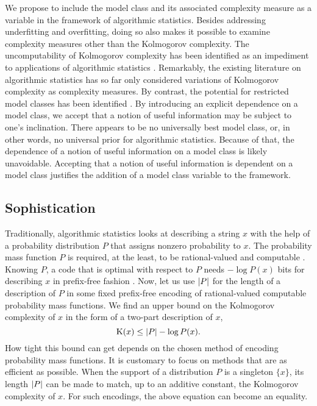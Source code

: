 We propose to include the model class and its associated complexity measure as a variable in the framework of algorithmic statistics.
Besides addressing underfitting and overfitting, doing so also makes it possible to examine complexity measures other than the Kolmogorov complexity.
The uncomputability of Kolmogorov complexity has been identified as an impediment to applications of algorithmic statistics \parencite{rissanen1983universal,vereshchagin2017algorithmic}.
Remarkably, the existing literature on algorithmic statistics has so far only considered variations of Kolmogorov complexity as complexity measures.
By contrast, the potential for restricted model classes has been identified \parencite{bloem2014safe,vereshchagin2017algorithmic}.
By introducing an explicit dependence on a model class, we accept that a notion of useful information may be subject to one's inclination.
There appears to be no universally best model class, or, in other words, no universal prior for algorithmic statistics.
Because of that, the dependence of a notion of useful information on a model class is likely unavoidable.
\slogan[\label{slo:useful_information}]{Useful information is context-dependent.}
Accepting that a notion of useful information is dependent on a model class justifies the addition of a model class variable to the framework.

\subsection{Sophistication}
Traditionally, algorithmic statistics looks at describing a string $x$ with the help of a probability distribution $P$ that assigns nonzero probability to $x$.
The probability mass function $P$ is required, at the least, to be rational-valued and computable \parencite{vereshchagin2017algorithmic}.
Knowing $P$, a code that is optimal with respect to $P$ needs $-\log P(x)$ bits for describing $x$ in prefix-free fashion \parencite{cover2006elements}.
Now, let us use ${\lvert P\rvert}$ for the length of a description of $P$ in some fixed prefix-free encoding of rational-valued computable probability mass functions.
We find an upper bound on the Kolmogorov complexity of $x$ in the form of a two-part description of $x$,
\begin{equation*}
  \operatorname{K}(x) \le {\lvert P\rvert} - \log P(x).
\end{equation*}
How tight this bound can get depends on the chosen method of encoding probability mass functions.
It is customary to focus on methods that are as efficient as possible.
When the support of a distribution $P$ is a singleton $\{x\}$, its length ${\lvert P\rvert}$ can be made to match, up to an additive constant, the Kolmogorov complexity of $x$.
For such encodings, the above equation can become an equality.


